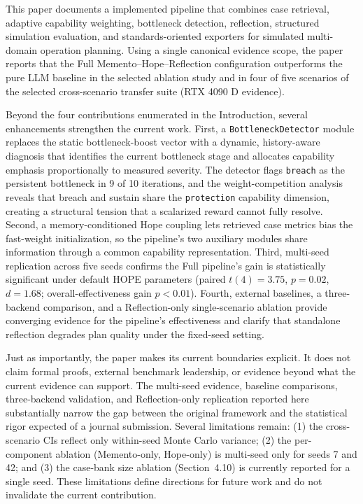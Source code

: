 This paper documents a implemented pipeline that combines case retrieval, adaptive capability weighting, bottleneck detection, reflection, structured simulation evaluation, and standards-oriented exporters for simulated multi-domain operation planning. Using a single canonical evidence scope, the paper reports that the Full Memento--Hope--Reflection configuration outperforms the pure LLM baseline in the selected ablation study and in four of five scenarios of the selected cross-scenario transfer suite (RTX 4090 D evidence).

Beyond the four contributions enumerated in the Introduction, several enhancements strengthen the current work. First, a \texttt{BottleneckDetector} module replaces the static bottleneck-boost vector with a dynamic, history-aware diagnosis that identifies the current bottleneck stage and allocates capability emphasis proportionally to measured severity. The detector flags \texttt{breach} as the persistent bottleneck in 9 of 10 iterations, and the weight-competition analysis reveals that breach and sustain share the \texttt{protection} capability dimension, creating a structural tension that a scalarized reward cannot fully resolve. Second, a memory-conditioned Hope coupling lets retrieved case metrics bias the fast-weight initialization, so the pipeline's two auxiliary modules share information through a common capability representation. Third, multi-seed replication across five seeds confirms the Full pipeline's gain is statistically significant under default HOPE parameters (paired $t(4)=3.75$, $p=0.02$, $d=1.68$; overall-effectiveness gain $p<0.01$). Fourth, external baselines, a three-backend comparison, and a Reflection-only single-scenario ablation provide converging evidence for the pipeline's effectiveness and clarify that standalone reflection degrades plan quality under the fixed-seed setting.

Just as importantly, the paper makes its current boundaries explicit. It does not claim formal proofs, external benchmark leadership, or evidence beyond what the current evidence can support. The multi-seed evidence, baseline comparisons, three-backend validation, and Reflection-only replication reported here substantially narrow the gap between the original framework and the statistical rigor expected of a journal submission. Several limitations remain: (1) the cross-scenario CIs reflect only within-seed Monte Carlo variance; (2) the per-component ablation (Memento-only, Hope-only) is multi-seed only for seeds 7 and 42; and (3) the case-bank size ablation (Section~4.10) is currently reported for a single seed. These limitations define directions for future work and do not invalidate the current contribution.
